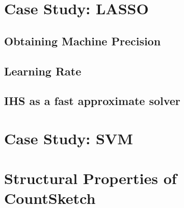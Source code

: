 \documentclass[twoside]{article}
\theoremstyle{definition}\newtheorem{thm}{Theorem}[section]
\theoremstyle{definition}\newtheorem{mydef}[thm]{Definition}
\theoremstyle{definition}\newtheorem{rem}[thm]{Remark}
\theoremstyle{definition}\newtheorem{prop}[thm]{Proposition}
\theoremstyle{definition}\newtheorem{example}[thm]{Example}
\theoremstyle{definition}\newtheorem{claim}[thm]{Claim}
\theoremstyle{definition}\newtheorem{Qu}[thm]{Question}
\theoremstyle{definition}\newtheorem{Lemma}[thm]{Lemma}
\theoremstyle{definition}\newtheorem{Cor}[thm]{Corollary}
\theoremstyle{definition}\newtheorem{Fact}[]{Fact}
\begin{document}
\section{Case Study: LASSO}

\subsection{Obtaining Machine Precision}

\subsection{Learning Rate}

\subsection{IHS as a fast approximate solver}

\section{Case Study: SVM}


\appendix

\section{Structural Properties of CountSketch} \label{sec: countsketch-proofs}







\end{document}
